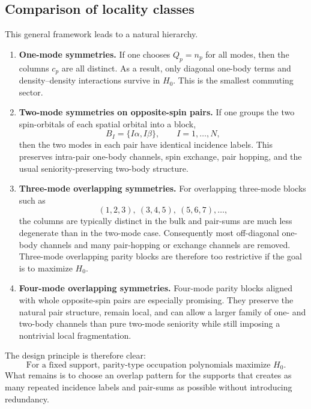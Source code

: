 \documentclass[11pt]{article}
\theoremstyle{definition}
\theoremstyle{remark}
\begin{document}
\subsection{Comparison of locality classes}
This general framework leads to a natural hierarchy.
\begin{enumerate}[leftmargin=2em]
  \item \textbf{One-mode symmetries.} If one chooses $Q_p=n_p$ for all modes, then the columns $c_p$ are all distinct. As a result, only diagonal one-body terms and density--density interactions survive in $H_0$. This is the smallest commuting sector.

  \item \textbf{Two-mode symmetries on opposite-spin pairs.} If one groups the two spin-orbitals of each spatial orbital into a block,
  \begin{equation}
    B_I=\{I\alpha,I\beta\},
    \qquad I=1,\dots,N,
  \end{equation}
  then the two modes in each pair have identical incidence labels. This preserves intra-pair one-body channels, spin exchange, pair hopping, and the usual seniority-preserving two-body structure.

  \item \textbf{Three-mode overlapping symmetries.} For overlapping three-mode blocks such as
  \begin{equation}
    (1,2,3),\ (3,4,5),\ (5,6,7),\dots,
  \end{equation}
  the columns are typically distinct in the bulk and pair-sums are much less degenerate than in the two-mode case. Consequently most off-diagonal one-body channels and many pair-hopping or exchange channels are removed. Three-mode overlapping parity blocks are therefore too restrictive if the goal is to maximize $H_0$.

  \item \textbf{Four-mode overlapping symmetries.} Four-mode parity blocks aligned with whole opposite-spin pairs are especially promising. They preserve the natural pair structure, remain local, and can allow a larger family of one- and two-body channels than pure two-mode seniority while still imposing a nontrivial local fragmentation.
\end{enumerate}

The design principle is therefore clear:
\begin{equation}
  \boxed{\text{For a fixed support, parity-type occupation polynomials maximize } H_0.}
\end{equation}
What remains is to choose an overlap pattern for the supports that creates as many repeated incidence labels and pair-sums as possible without introducing redundancy.
\end{document}
